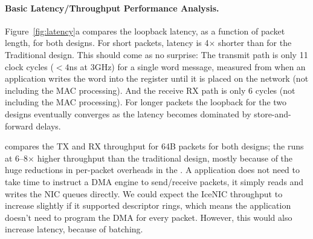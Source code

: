 \paragraph{Basic Latency/Throughput Performance Analysis.} 
Figure~\ref{fig:latency}a compares the loopback latency, as a function of packet length, for both designs. For short packets, \name{} latency is 4$\times$ shorter than for the Traditional design. This should come as no surprise: The \name{} transmit path is only 11 clock cycles ($<4$ns at 3GHz) for a single word message, measured from when an application writes the word into the register until it is placed on the network (not including the MAC processing). And the \name{} receive RX path is only 6 cycles (not including the MAC processing). For longer packets the loopback for the two designs eventually converges as the latency becomes dominated by store-and-forward delays. 

 compares the TX and RX throughput for 64B packets for both designs; the \name{} runs at 6--8$\times$ higher throughput than the traditional design, mostly because of the huge reductions in per-packet overheads in the \name{}.
A \name{} application does not need to take time to instruct a DMA engine to send/receive packets, it simply reads and writes the NIC queues directly. We could expect the IceNIC throughput to increase slightly if it supported descriptor rings, which means the application doesn't need to program the DMA for every packet. However, this would also increase latency, because of batching.


